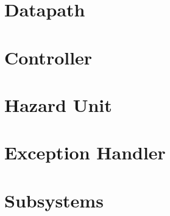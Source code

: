 \documentclass[12pt,letterpaper]{article}
\begin{document}
\section{Datapath}


\section{Controller}


\section{Hazard Unit}


\section{Exception Handler}



\section{Subsystems}

\pagebreak


\pagebreak


\pagebreak


\pagebreak
\end{document}
